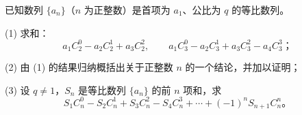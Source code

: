 \begin{question}
已知数列 \(\{a_n\}\)（\(n\) 为正整数）是首项为 \(a_1\)、公比为 \(q\) 的等比数列。

    (1) 求和：
\nopagebreak[4]
\[
    a_1C_2^0-a_2C_2^1+a_3C_2^2,\qquad
    a_1C_3^0-a_2C_3^1+a_3C_3^2-a_4C_3^3\text{；}
\]

    (2) 由 (1) 的结果归纳概括出关于正整数 \(n\) 的一个结论，并加以证明；

    (3) 设 \(q\ne1\)，\(S_n\) 是等比数列 \(\{a_n\}\) 的前 \(n\) 项和，求
\nopagebreak[4]
\[
    S_1C_n^0-S_2C_n^1+S_3C_n^2-S_4C_n^3+\cdots+(-1)^nS_{n+1}C_n^n\mbox{。}
\]

\end{question}
